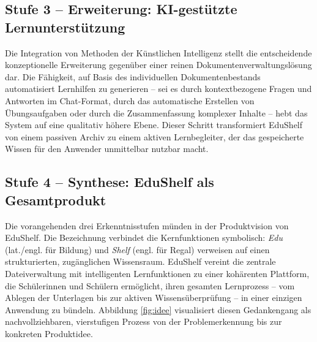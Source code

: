 \subsection{Stufe 3 -- Erweiterung: KI-gestützte Lernunterstützung}

Die Integration von Methoden der Künstlichen Intelligenz stellt die entscheidende konzeptionelle Erweiterung gegenüber einer reinen Dokumentenverwaltungslösung dar. Die Fähigkeit, auf Basis des individuellen Dokumentenbestands automatisiert Lernhilfen zu generieren -- sei es durch kontextbezogene Fragen und Antworten im Chat-Format, durch das automatische Erstellen von Übungsaufgaben oder durch die Zusammenfassung komplexer Inhalte -- hebt das System auf eine qualitativ höhere Ebene. Dieser Schritt transformiert EduShelf von einem passiven Archiv zu einem aktiven Lernbegleiter, der das gespeicherte Wissen für den Anwender unmittelbar nutzbar macht.

\subsection{Stufe 4 -- Synthese: EduShelf als Gesamtprodukt}

Die vorangehenden drei Erkenntnisstufen münden in der Produktvision von EduShelf. Die Bezeichnung verbindet die Kernfunktionen symbolisch: \textit{Edu} (lat./engl. für Bildung) und \textit{Shelf} (engl. für Regal) verweisen auf einen strukturierten, zugänglichen Wissensraum. EduShelf vereint die zentrale Dateiverwaltung mit intelligenten Lernfunktionen zu einer kohärenten Plattform, die Schülerinnen und Schülern ermöglicht, ihren gesamten Lernprozess -- vom Ablegen der Unterlagen bis zur aktiven Wissensüberprüfung -- in einer einzigen Anwendung zu bündeln. Abbildung \ref{fig:idee} visualisiert diesen Gedankengang als nachvollziehbaren, vierstufigen Prozess von der Problemerkennung bis zur konkreten Produktidee.
